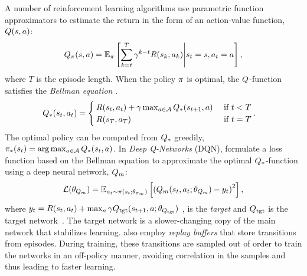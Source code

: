 A number of reinforcement learning algorithms use parametric function
approximators to estimate the return in the form of 
an action-value function, $Q(s, a)$:
%
\begin{align}
Q_\pi(s, a) = \mathbb{E}_\pi\left[ \sum_{k=t}^T
  \gamma^{k-t} R(s_k, a_k)
  \middle| s_t = s, a_t = a \right] ,
  \label{eq:q-def}
\end{align}%
where $T$ is the episode length.
%
When the policy $\pi$ is optimal, the $Q$-function satisfies the
\emph{Bellman equation} \citep{bellman1954theory}.
%
\begin{align}
    Q_{*}(s_t, a_t)
  &=
    \begin{cases}
        R(s_t, a_t) + \gamma \max_{a \in \mathcal{A}}
        Q_{*}(s_{t+1}, a)
      & \text{ if } t < T
      \\
      R(s_T, a_T) & \text{ if } t = T
    \end{cases}.
  \label{eq:bellman}
\end{align}%
%
The optimal policy can be computed from $Q_{*}$ greedily, 
$\pi_*(s_t) = \arg \max_{a \in \mathcal{A}} Q_*(s_t,
a)$.
In \emph{Deep Q-Networks} (DQN), \citet{mnih2013playing} formulate a loss function based on 
the Bellman equation to approximate the optimal $Q_{*}$-function using
a deep neural network, $Q_m$:
%
%
\begin{align}
  \mathcal{L}(\theta_{Q_m}) =
    \mathbb{E}_{a_t\sim\pi(s_t; \theta_{\pi_m})}\left[\left(
  Q_m(s_t, a_t; \theta_{Q_m}) -
  y_t  \right)^2\right],
  \label{eq:bellman-dqn}
\end{align}
where 
$y_t = R(s_t, a_t) + \max_{a}\gamma Q_{\text{tgt}}(s_{t+1}, a; \theta_{Q_{\text{tgt}}}) $
, is the \emph{target} and $Q_{\text{tgt}}$ is the target
network~\citep{MnKaSiNATURE2015}.
The target network is a slower-changing
copy of the main network that stabilizes learning.
\citet{MnKaSiNATURE2015} also employ \emph{replay buffers}
that store transitions from episodes. During training, these transitions are
sampled out of order to train the networks in an off-policy manner, avoiding
correlation in the samples and thus leading to faster learning.

